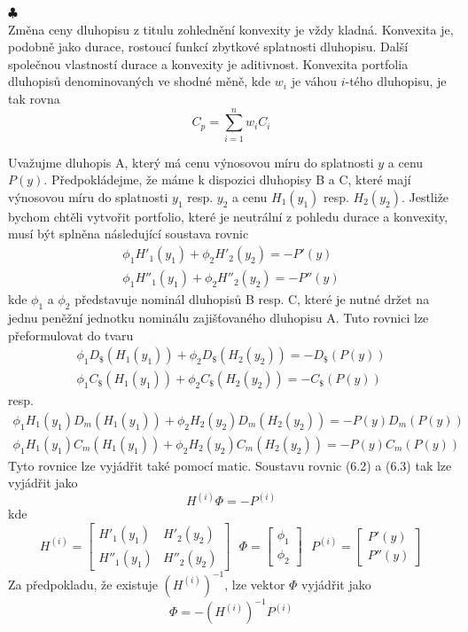 \documentclass[a4paper]{book}
\begin{document}
$\clubsuit$\\

Změna ceny dluhopisu z titulu zohlednění konvexity je vždy kladná. Konvexita je, podobně jako durace, rostoucí funkcí zbytkové splatnosti dluhopisu. Další společnou vlastností durace a konvexity je aditivnost. Konvexita portfolia dluhopisů denominovaných ve shodné měně, kde $w_i$ je váhou $i$-tého dluhopisu, je tak rovna
\begin{equation*}
C_p = \sum_{i = 1}^n w_i C_i
\end{equation*}

Uvažujme dluhopis A, který má cenu výnosovou míru do splatnosti $y$ a cenu $P(y)$. Předpokládejme, že máme k dispozici dluhopisy B a C, které mají výnosovou míru do splatnosti $y_1$ resp. $y_2$ a cenu $H_1(y_1)$ resp. $H_2(y_2)$. Jestliže bychom chtěli vytvořit portfolio, které je neutrální z pohledu durace a konvexity, musí být splněna následující soustava rovnic
\begin{gather}
\phi_1 H'_1(y_1) + \phi_2 H'_2(y_2) = -P'(y)\\
\phi_1 H''_1(y_1) + \phi_2 H''_2(y_2) = -P''(y)
\end{gather} 
kde $\phi_1$ a $\phi_2$ představuje nominál dluhopisů B resp. C, které je nutné držet na jednu peněžní jednotku nominálu zajišťovaného dluhopisu A. Tuto rovnici lze přeformulovat do tvaru
\begin{gather*}
\phi_1 D_{\$}(H_1(y_1)) + \phi_2 D_{\$}(H_2(y_2)) = - D_{\$}(P(y))\\
\phi_1 C_{\$}(H_1(y_1)) + \phi_2 C_{\$}(H_2(y_2)) = - C_{\$}(P(y))
\end{gather*}
resp.
\begin{gather*}
\phi_1 H_1(y_1)D_{m}(H_1(y_1)) + \phi_2 H_2(y_2)D_{m}(H_2(y_2)) = - P(y)D_{m}(P(y))\\
\phi_1 H_1(y_1)C_{m}(H_1(y_1)) + \phi_2 H_2(y_2)C_{m}(H_2(y_2)) = - P(y)C_{m}(P(y))
\end{gather*}
Tyto rovnice lze vyjádřit také pomocí matic. Soustavu rovnic (6.2) a (6.3) tak lze vyjádřit jako
\begin{equation*}
H^{(i)} \Phi = -P^{(i)}
\end{equation*}
kde
\begin{equation*}
H^{(i)} =
\begin{bmatrix}
H'_1(y_1) & H'_2(y_2) \\
H''_1(y_1) & H''_2(y_2)
\end{bmatrix}
~~~
\Phi =
\begin{bmatrix}
\phi_1 \\
\phi_2
\end{bmatrix}
~~~
P^{(i)} =
\begin{bmatrix}
P'(y) \\
P''(y)
\end{bmatrix}
\end{equation*}
Za předpokladu, že existuje $(H^{(i)})^{-1}$, lze vektor $\Phi$ vyjádřit jako
\begin{equation*}
\Phi = -(H^{(i)})^{-1} P^{(i)}
\end{equation*}
\end{document}
